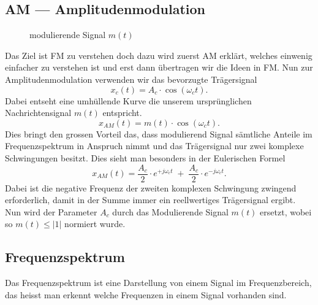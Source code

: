 %
%
%
\subsection{AM --- Amplitudenmodulation\label{fm:section:teil0}}
\begin{figure}
	\centering
	
	\caption{modulierende Signal \(m(t)\)}
	\label{fig:}
\end{figure}
Das Ziel ist FM zu verstehen doch dazu wird zuerst AM erklärt,
welches einwenig einfacher zu verstehen ist und erst dann übertragen
wir die Ideen in FM.
Nun zur Amplitudenmodulation verwenden wir das bevorzugte Trägersignal
\[
    x_c(t) = A_c \cdot \cos(\omega_ct).
\]
Dabei entseht eine umhüllende Kurve die unserem ursprünglichen Nachrichtensignal \(m(t)\) entspricht.
\[
    x_{AM}(t) = m(t) \cdot \cos(\omega_ct).
\]
Dies bringt den grossen Vorteil das, dass modulierend Signal sämtliche Anteile im Frequenzspektrum in Anspruch nimmt 
und das Trägersignal nur zwei komplexe Schwingungen besitzt. 
Dies sieht man besonders in der Eulerischen Formel
\[
    x_{AM}(t) = \frac{A_c}{2} \cdot e^{+j\omega_ct}\;+\;\frac{A_c}{2} \cdot e^{-j\omega_ct}.
    \label{fm:eq:AM:euler}
\]
Dabei ist die negative Frequenz der zweiten komplexen Schwingung zwingend erforderlich, damit in der Summe immer ein reellwertiges Trägersignal ergibt.
Nun wird der Parameter \(A_c\) durch das  Modulierende Signal \(m(t)\) ersetzt, wobei so \(m(t) \leqslant |1|\) normiert wurde.

\subsection{Frequenzspektrum}
Das Frequenzspektrum ist eine Darstellung von einem Signal im Frequenzbereich, das heisst man erkennt welche Frequenzen in einem Signal vorhanden sind.

